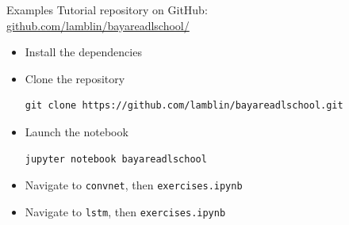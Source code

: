 \documentclass[a4paper,9pt]{beamer}
\begin{document}
\begin{frame}[fragile]{Examples}
  Tutorial repository on GitHub:\\
  \url{github.com/lamblin/bayareadlschool/}

  \begin{itemize}
    \item Install the dependencies
    \item Clone the repository
      \begin{verbatim}
git clone https://github.com/lamblin/bayareadlschool.git
      \end{verbatim}
    \item Launch the notebook
      \begin{verbatim}
jupyter notebook bayareadlschool
      \end{verbatim}
    \item Navigate to {\tt convnet}, then {\tt exercises.ipynb}
    \item Navigate to {\tt lstm}, then {\tt exercises.ipynb}
  \end{itemize}
\end{frame}
\end{document}
